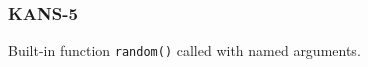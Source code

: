 \subsubsection{KANS-5}\label{sec:error_code_kans_5}

Built-in function \texttt{random()} called with named arguments.


